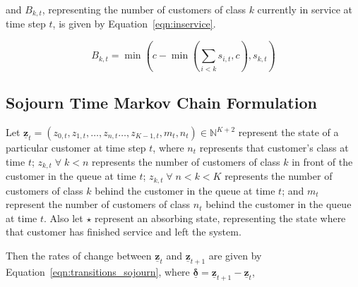 \documentclass{article}
\begin{document}
and $B_{k,t}$, representing the number of customers of class $k$ currently in
service at time step $t$, is given by Equation~\ref{eqn:inservice}.

\begin{equation}\label{eqn:inservice}
B_{k,t} =\min\left(c - \min\left(\sum_{i < k} s_{i,t}, c\right), s_{k,t}\right)
\end{equation}




\subsection{Sojourn Time Markov Chain Formulation}\label{sec:sojourn_formulation}
Let $\underline{\mathbf{z}}_t = (z_{0,t}, z_{1,t}, \dots, z_{n,t} \dots, z_{K-1,t}, m_t, n_t) \in \mathbb{N}^{K+2}$
represent the state of a particular customer at time step $t$, where $n_t$
represents that customer's class at time $t$; $z_{k,t} \; \forall \; k < n$
represents the number of customers of class $k$ in front of the customer in the
queue at time $t$; $z_{k,t} \; \forall \; n < k < K$ represents the number of
customers of class $k$ behind the customer in the queue at time $t$; and $m_t$
represent the number of customers of class $n_t$ behind the customer in the
queue at time $t$.
Also let $\star$ represent an absorbing state, representing the state where that
customer has finished service and left the system.

Then the rates of change between $\underline{\mathbf{z}}_t$ and
$\underline{\mathbf{z}}_{t+1}$ are given by Equation~\ref{eqn:transitions_sojourn},
where $\underline{\mathbf{\delta}} = \underline{\mathbf{z}}_{t+1} - \underline{\mathbf{z}}_t$,
\end{document}

